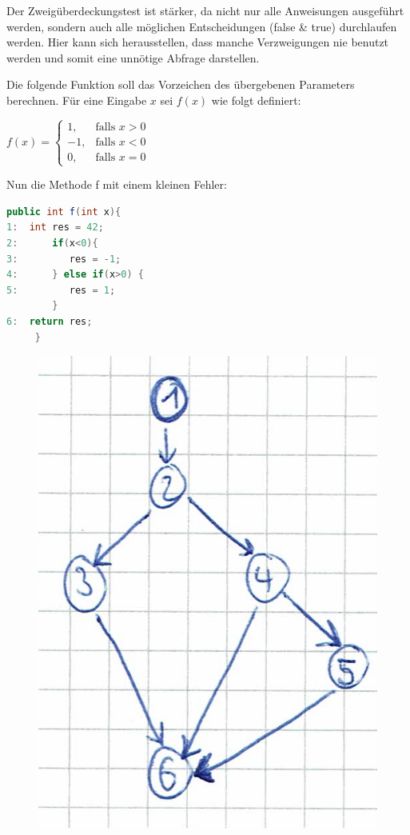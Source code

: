 Der Zweigüberdeckungstest ist stärker, da nicht nur alle Anweisungen ausgeführt werden, sondern auch alle möglichen Entscheidungen
(false \& true) durchlaufen werden. Hier kann sich herausstellen, dass manche Verzweigungen nie benutzt werden und somit eine unnötige
Abfrage darstellen. 


Die folgende Funktion soll das Vorzeichen des übergebenen Parameters berechnen. Für eine Eingabe $x$ sei $f(x)$ wie folgt
definiert:
\begin{center}
$f(x) = \begin{cases}
	1,   & \text{falls } x > 0 \\
	-1,   & \text{falls } x < 0\\
	0,   & \text{falls } x = 0
\end{cases}$ \\
\end{center}
Nun die Methode f mit einem kleinen Fehler:
\begin{lstlisting}[language=Java]
     public int f(int x){
1: 	int res = 42;
2:      if(x<0){
3:         res = -1;
4:      } else if(x>0) {
5:         res = 1;
        }
6:	return res;
     }
\end{lstlisting}
\begin{figure}[h]
  \centering
  \includegraphics{3b_cont.jpg}
\end{figure}

